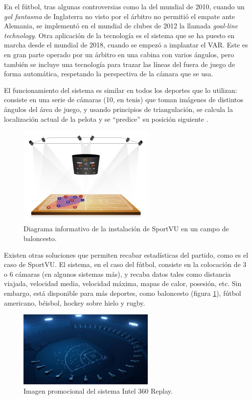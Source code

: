 En el fútbol, tras algunas controversias como la del mundial de 2010, cuando un \textit{gol fantasma} de Inglaterra no visto por el árbitro no permitió el empate ante Alemania, se implementó en el mundial de clubes de 2012 la llamada \textit{goal-line technology}. Otra aplicación de la tecnología es el sistema que se ha puesto en marcha desde el mundial de 2018, cuando se empezó a implantar el VAR. Este es en gran parte operado por un árbitro en una cabina con varios ángulos, pero también se incluye una tecnología para trazar las líneas del fuera de juego de forma automática, respetando la perspectiva de la cámara que se usa.

El funcionamiento del sistema es similar en todos los deportes que lo utilizan: consiste en una serie de cámaras (10, en tenis) que toman imágenes de distintos ángulos del área de juego, y usando principios de triangulación, se calcula la localización actual de la pelota y se ``predice'' su posición siguiente \cite{wiki:hawk}.

\begin{figure}
    \centering
    \includegraphics[width=0.6\textwidth]{images/sportVU}
    \caption{Diagrama informativo de la instalación de SportVU en un campo de baloncesto.}
    \label{fig:sportVU}
\end{figure}

Existen otras soluciones que permiten recabar estadísticas del partido, como es el caso de SportVU. El sistema, en el caso del fútbol, consiste en la colocación de 3 o 6 cámaras (en algunos sistemas más), y recaba datos tales como distancia viajada, velocidad media, velocidad máxima, mapas de calor, posesión, etc. Sin embargo, está disponible para más deportes, como baloncesto  (figura \ref{fig:sportVU}), fútbol americano, béisbol, hockey sobre hielo y rugby.

\begin{figure}
    \centering
    \includegraphics[width=0.6\textwidth]{images/intel360}
    \caption{Imagen promocional del sistema Intel 360 Replay.}
    \label{fig:intel360}
\end{figure}

